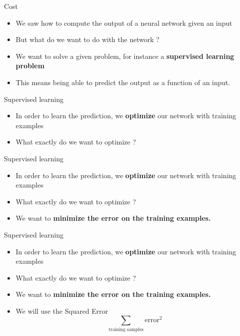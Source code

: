 \documentclass{beamer}
\begin{document}
\begin{frame}{Cost}
    \begin{itemize}
        \item We saw how to compute the output of a neural network given an
            input
        \item But what do we want to do with the network ?
        \item We want to solve a given problem, for instance a
            \textbf{{supervised learning problem}} 
        \item This means being able to predict the output as a function of an
            input.
    \end{itemize}
\end{frame}

\begin{frame}{Supervised learning}
    \begin{itemize}
        \item In order to learn the prediction, we \textbf{{optimize}} our
            network with training examples
        \item What exactly do we want to optimize ?
    \end{itemize}
\end{frame}


\begin{frame}{Supervised learning}
    \begin{itemize}
        \item In order to learn the prediction, we \textbf{{optimize}} our
            network with training examples
        \item What exactly do we want to optimize ?
        \item We want to \textbf{minimize the error on the training examples.}
    \end{itemize}
\end{frame}


\begin{frame}{Supervised learning}
    \begin{itemize}
        \item In order to learn the prediction, we \textbf{{optimize}} our
            network with training examples
        \item What exactly do we want to optimize ?
        \item We want to \textbf{minimize the error on the training examples.}
        \item We will use the Squared Error
            \begin{equation}
                \sum_{\text{training samples}}\text{error}^2 
            \end{equation}
    \end{itemize}
\end{frame}
\end{document}
